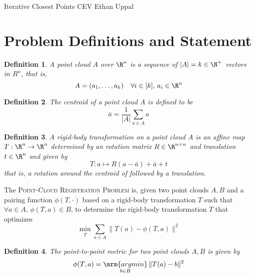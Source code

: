 \documentclass[12pt]{article}
\theoremstyle{defstyle}
\newtheorem{defn}{Definition}
\begin{document}
\begin{generic}
    Iterative Closest Points \hfill CEV \vbar Ethan Uppal
\end{generic}

\section{Problem Definitions and Statement}

\begin{defn}
    A \emph{point cloud} $A$ over $\R^n$ is a sequence of $|A| = k \in \N^+$ vectors in $R^n$, that is,
    \[
        A = (a_1, \dots, a_k) \quad \forall i \in [k],\, a_i \in \R^n
    \]
\end{defn}

\begin{defn}
    The \emph{centroid} of a point cloud $A$ is defined to be
    \[
        \bar{a} = \frac{1}{|A|} \sum_{a \in A} a
    \]
\end{defn}

\begin{defn}
    A \emph{rigid-body transformation} on a point cloud $A$ is an affine map $T : \R^n \to \R^n$ determined by an rotation matrix $R \in \R^{n \times n}$ and translation $t \in \R^n$ and given by
    \[
        T : a \mapsto R(a - \bar{a}) + \bar{a} + t
    \]
    that is, a rotation around the centroid of followed by a translation.
\end{defn}

\begin{outline}
    The \textsc{Point-Cloud Registration Problem} is, given two point clouds $A, B$ and a pairing function $\phi(T, \cdot)$ based on a rigid-body transformation $T$ such that $\forall a \in A,\, \phi(T, a) \in B$, to determine the rigid-body transformation $T$ that optimizes
    \begin{equation}\label{icp}
        \min\limits_{\substack{T}} \sum_{a \in A} \| T(a) - \phi(T, a) \|^2
    \end{equation}
\end{outline}

\begin{defn}
    The \emph{point-to-point metric} for two point clouds $A, B$ is given by
    \begin{equation}
        \phi(T, a) = \mathop{\mrm{argmin}}\limits_{\substack{b \in B}} \| T(a) - b \|^2
    \end{equation}
\end{defn}
\end{document}

